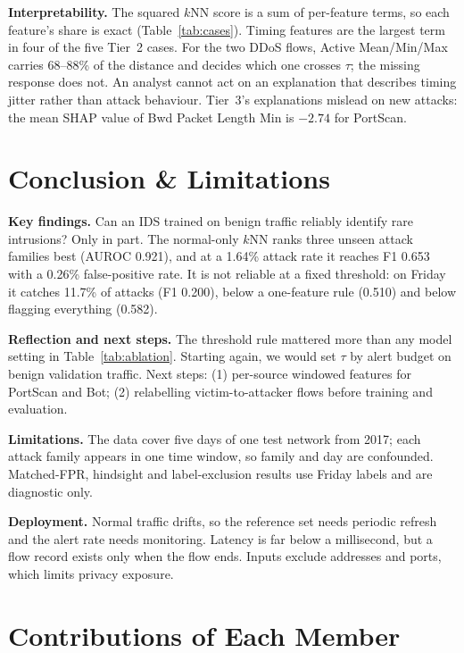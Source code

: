 \documentclass[11pt]{article}
\begin{document}
\textbf{Interpretability.} The squared $k$NN score is a sum of per-feature terms, so each feature's share is exact (Table~\ref{tab:cases}). Timing features are the largest term in four of the five Tier~2 cases. For the two DDoS flows, Active Mean/Min/Max carries 68--88\% of the distance and decides which one crosses $\tau$; the missing response does not. An analyst cannot act on an explanation that describes timing jitter rather than attack behaviour. Tier~3's explanations mislead on new attacks: the mean SHAP value \citep{lundberg2017} of Bwd Packet Length Min is $-2.74$ for PortScan.

\section{Conclusion \& Limitations}
\label{sec:conclusion}

\textbf{Key findings.} Can an IDS trained on benign traffic reliably identify rare intrusions? Only in part. The normal-only $k$NN ranks three unseen attack families best (AUROC 0.921), and at a 1.64\% attack rate it reaches F1 0.653 with a 0.26\% false-positive rate. It is not reliable at a fixed threshold: on Friday it catches 11.7\% of attacks (F1 0.200), below a one-feature rule (0.510) and below flagging everything (0.582).

\textbf{Reflection and next steps.} The threshold rule mattered more than any model setting in Table~\ref{tab:ablation}. Starting again, we would set $\tau$ by alert budget on benign validation traffic. Next steps: (1) per-source windowed features for PortScan and Bot; (2) relabelling victim-to-attacker flows before training and evaluation.

\textbf{Limitations.} The data cover five days of one test network from 2017; each attack family appears in one time window, so family and day are confounded. Matched-FPR, hindsight and label-exclusion results use Friday labels and are diagnostic only.

\textbf{Deployment.} Normal traffic drifts, so the reference set needs periodic refresh and the alert rate needs monitoring. Latency is far below a millisecond, but a flow record exists only when the flow ends. Inputs exclude addresses and ports, which limits privacy exposure.


\section*{Contributions of Each Member}
\end{document}
